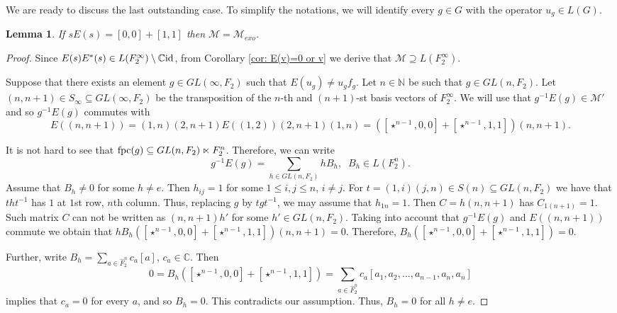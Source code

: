 \documentclass[11pt]{amsart}
\newcommand{\id}{{\rm id}}
\newcommand{\fpc}{{\rm fpc}}
\newcommand{\ie}{\text{i.e.\;}}
\theoremstyle{plain}
\newtheorem{lemma}[theorem]{Lemma}
\theoremstyle{definition}
\theoremstyle{remark}
\numberwithin{equation}{section}
\begin{document}
We are ready to discuss the last outstanding case. To simplify the notations, we will identify every $g\in G$ with the operator $u_g\in L(G)$.
	\begin{lemma}\label{prop: (01 10)E((01 10)) other}
If $sE(s)=[0,0]+[1,1]$ 	then  $\mathcal {M}= \mathcal{M}_{exo}$. 
\end{lemma}
\begin{proof}
	Since $E(s)E^*(s) \in L(F_2^\infty)\setminus \mathbb C\id$, from Corollary \ref{cor: E(v)=0 or v} we derive that $\mathcal M\supseteq L(F_2^\infty)$.

Suppose that there exists an element $g\in GL(\infty,F_2)$ such that $E(u_g)\neq u_g f_g$. 
Let $n\in\mathbb N$ be such that $g\in GL(n,F_2)$. Let $(n,n+1)\in S_\infty\subseteq GL(\infty, F_2)$ be the transposition of the $n$-th and $(n+1)$-st basis vectors of $F_2^\infty$. We will use that $g^{-1}E(g)\in \mathcal M'$ and so $g^{-1}E(g)$ commutes with $$E((n,n+1))=(1,n)(2,n+1)E((1,2))(2,n+1)(1,n)=([\star^{n-1},0,0]+[\star^{n-1},1,1])(n,n+1).$$

It is not hard to see that $\fpc(g)\subseteq GL(n,F_2)\ltimes F_2^n$. Therefore, we can write 
$$g^{-1}E(g)=\sum\limits_{h\in GL(n,F_2)}h B_h,\;\;B_h\in L(F_2^n).$$ Assume that $B_h\neq 0$ for some $h\neq e$. Then $h_{ij}=1$ for some $1\leqslant i,j\leqslant n$, $i\neq j$. For $t=(1,i)(j,n)\in S(n)\subseteq GL(n,F_2)$ we have that $tht^{-1}$ has $1$ at $1$st row, $n$th column. Thus, replacing $g$ by $tgt^{-1}$, we may assume that $h_{1n}=1$. Then $C=h(n,n+1)$ has $C_{1(n+1)}=1$. Such matrix $C$ can not be written as $(n,n+1)h'$ for some $h'\in GL(n,F_2)$. Taking into account that $g^{-1}E(g)$ and $E((n,n+1))$ commute we obtain that $h B_h([\star^{n-1},0,0]+[\star^{n-1},1,1])(n,n+1)=0$. Therefore, $B_h([\star^{n-1},0,0]+[\star^{n-1},1,1])=0$.

Further, write $B_h=\sum\limits_{a\in \widehat F_2^n}c_a[a]$, $c_a\in\mathbb C$. Then $$0=B_h([\star^{n-1},0,0]+[\star^{n-1},1,1])=\sum\limits_{a\in \widehat F_2^n}c_a[a_1,a_2,\ldots,a_{n-1},a_n,a_n]$$ implies that $c_a=0$ for every $a$, and so $B_h=0$. This contradicts our assumption. Thus, $B_h=0$ for all $h\neq e$.


\end{proof}
\end{document}
